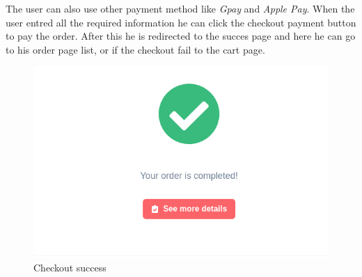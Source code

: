 The user can also use other payment method like \textit{Gpay} and \textit{Apple Pay}.
When the user entred all the required information he can click the checkout payment button to pay the order. After this he is redirected to the succes page and here he can go to his order page list, or if the checkout fail to the cart page.
\begin{figure}[!ht]
    \caption{Checkout success}
    \vspace{10px}
    \includegraphics[scale=0.5]{../../../../Images/userManual/checkoutSuccess.png}
    \centering
\end{figure}
